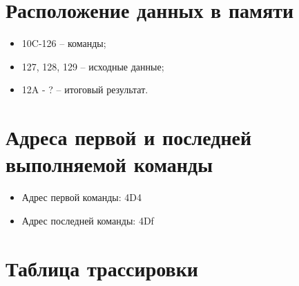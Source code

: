 \documentclass{article}
\begin{document}
\section{Расположение данных в памяти}

\begin{itemize}
  \item 10C-126 – команды;
  \item 127, 128, 129 – исходные данные;
  \item 12A - ? – итоговый результат.
\end{itemize}

\section{Адреса первой и последней выполняемой команды}

\begin{itemize}
  \item Адрес первой команды: 4D4
  \item Адрес последней команды: 4Df
\end{itemize}


\section{Таблица трассировки}
\end{document}
